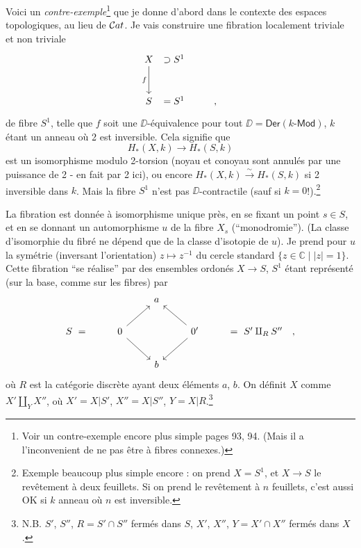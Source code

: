 
Voici un \textit{contre-exemple}\footnote[42]{Voir un contre-exemple encore plus simple pages 93, 94. (Mais il a l'inconvenient de ne pas être à fibres connexes.) %
} que je donne d'abord dans le contexte des espaces topologiques, au lieu de $\mathcal{C}at$. Je vais construire une fibration localement triviale et non triviale
\[
\begin{tikzcd}[column sep=0.2em, row sep=large]
X \arrow[d, "f"'] & \supset S^1 & \\
S & = S^1 & \qquad ,
\end{tikzcd}
\]
de fibre $S^1$, telle que $f$ soit une $\DD$-équivalence pour tout $\DD = \mathsf{Der}(k\text{-}\mathsf{Mod})$, $k$ étant un anneau où 2 est inversible. Cela signifie que
\[
H_*(X,k) \longrightarrow H_*(S,k)
\]
est un isomorphisme modulo 2-torsion (noyau et conoyau sont annulés par une puissance de 2 - en fait par 2 ici), ou encore $H_*(X,k) \xrightarrow{\sim} H_*(S,k)$ si 2 inversible dans $k$. Mais la fibre $S^1$ n'est pas $\DD$-contractile (sauf si $k = 0$!).\footnote[43]{Exemple beaucoup plus simple encore : on prend $X = S^1$, et $X \to S$ le revêtement à deux feuillets. Si on prend le revêtement à $n$ feuillets, c'est aussi OK si $k$ anneau où $n$ est inversible.}

\indent La fibration est donnée à isomorphisme unique près, en se fixant un point $s \in S$, et en se donnant un automorphisme $u$ de la fibre $X_s$ (“monodromie”). (La classe d'isomorphie du fibré ne dépend que de la classe d'isotopie de $u$). Je prend pour $u$ la symétrie (inversant l'orientation) $z \mapsto z^{-1}$ du cercle standard $\{z \in \mathbb{C} \mid |z| = 1\}$. Cette fibration “se réalise” par des ensembles ordonés $X \to S$, $S^1$ étant représenté (sur la base, comme sur les fibres) par %
\[
\begin{tikzcd}[column sep=normal, row sep=normal]
& & a & & \\
S \ = & 0 \arrow[ur] \arrow[dr] & & 0' \arrow[ul] \arrow[dl] & = \ S' \amalg_R S'' \quad , \\
& & b & &
\end{tikzcd}
\]
où $R$ est la catégorie discrète ayant deux éléments $a$, $b$. On définit $X$ comme $X' \amalg_Y X''$, où $X' = X|S'$, $X'' = X|S''$, $Y = X|R$.\footnote[44]{N.B. $S'$, $S''$, $R = S' \cap S''$ fermés dans $S$, $X'$, $X''$, $Y = X' \cap X''$ fermés dans $X$.}

